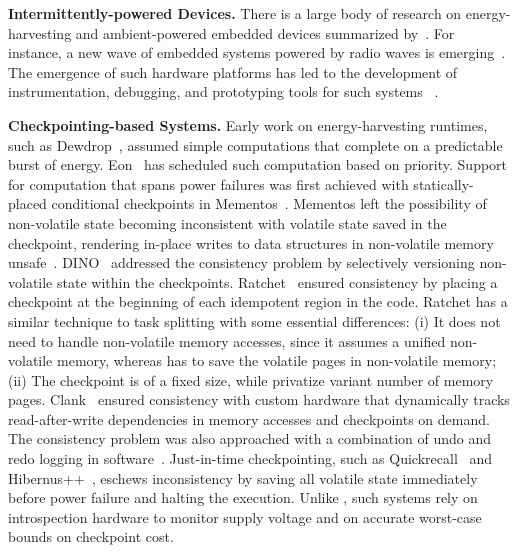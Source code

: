 \textbf{Intermittently-powered Devices.} There is a large body of research on energy-harvesting and ambient-powered embedded devices summarized by~\cite{prasad_comst_2014,sample_procieee_2013,huang:commag:2015,visser_procieee_2013,kamalinejad_commag_2015,ku_cst_2016}. For instance, a new wave of embedded systems powered by radio waves is emerging~\cite{patel_pervasive_2017,rf_powered_computing_gollakota_2014,wisp5,moo,zhao_rfid_2015,holleman_biocas_2008,thomas_jbcs_2012,naderiparizi_rfid_2015,rodriguez_tbcs_2015,liu_sigcomm_2013,kicksat,nadeau_naturebio_2017}. The emergence of such hardware platforms
has led to the development of instrumentation, debugging, and prototyping tools for such systems
~\cite{hester_sensys_2014,hester_sensys_2015,edb,capybara,stork,wisent,flicker}.

\textbf{Checkpointing-based Systems.} Early work on energy-harvesting runtimes, such as Dewdrop~\cite{dewdrop}, assumed simple computations that complete on a predictable burst of energy. Eon~\cite{sorber_sensys_2007} has scheduled such computation based on priority. Support for computation that spans power failures was first achieved with statically-placed conditional checkpoints in Mementos~\cite{mementos}. Mementos left the possibility of non-volatile state becoming inconsistent with volatile state saved in the checkpoint, rendering in-place writes to data structures in non-volatile memory unsafe~\cite{mspcdino}. DINO~\cite{dino} addressed the consistency problem by selectively versioning non-volatile state within the checkpoints. Ratchet~\cite{ratchet} ensured consistency by placing a checkpoint at the beginning of each idempotent region in the code. Ratchet has a similar technique to task splitting with some essential differences: (i) It does not need to handle non-volatile memory accesses, since it assumes a unified non-volatile memory, whereas \sys has to save the volatile pages in non-volatile memory; (ii) The checkpoint is of a fixed size, while \sys privatize variant number of memory pages.  Clank~\cite{hicks_isca_2017} ensured consistency with custom hardware that dynamically tracks read-after-write dependencies in memory accesses and checkpoints on demand. The consistency problem was also approached with a combination of undo and redo logging in software~\cite{baghsorkhi_cgo_2018}. Just-in-time checkpointing, such as Quickrecall~\cite{quickrecall} and Hibernus++~\cite{hibernusplusplus}, eschews inconsistency by saving all volatile state immediately before power failure and halting the execution. Unlike \sys, such systems rely on introspection hardware to monitor supply voltage and on accurate worst-case bounds on checkpoint cost.

